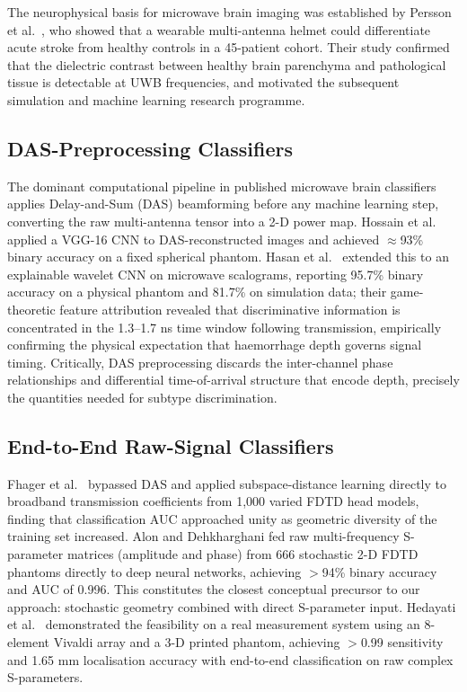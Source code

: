 \documentclass[journal]{IEEEtran}
\begin{document}
The neurophysical basis for microwave brain imaging was
established by Persson et al.\ \cite{Persson2014}, who showed
that a wearable multi-antenna helmet could differentiate acute
stroke from healthy controls in a 45-patient cohort.  Their
study confirmed that the dielectric contrast between healthy
brain parenchyma and pathological tissue is detectable at UWB
frequencies, and motivated the subsequent simulation and
machine learning research programme.

\subsection{DAS-Preprocessing Classifiers}

The dominant computational pipeline in published microwave
brain classifiers applies Delay-and-Sum (DAS) beamforming
before any machine learning step, converting the raw
multi-antenna tensor into a 2-D power map.  Hossain et al.\
\cite{Hossain2020} applied a VGG-16 CNN to DAS-reconstructed
images and achieved $\approx$93\% binary accuracy on a fixed
spherical phantom.  Hasan et al.\ \cite{Hasan2024} extended
this to an explainable wavelet CNN on microwave scalograms,
reporting 95.7\% binary accuracy on a physical phantom and
81.7\% on simulation data; their game-theoretic feature
attribution revealed that discriminative information is
concentrated in the 1.3--1.7 ns time window following
transmission, empirically confirming the physical expectation
that haemorrhage depth governs signal timing.  Critically,
DAS preprocessing discards the inter-channel phase
relationships and differential time-of-arrival structure that
encode depth, precisely the quantities needed for subtype
discrimination.

\subsection{End-to-End Raw-Signal Classifiers}

Fhager et al.\ \cite{Fhager2019} bypassed DAS and applied
subspace-distance learning directly to broadband transmission
coefficients from 1{,}000 varied FDTD head models, finding
that classification AUC approached unity as geometric
diversity of the training set increased.  Alon and
Dehkharghani \cite{Alon2021} fed raw multi-frequency
S-parameter matrices (amplitude and phase) from 666
stochastic 2-D FDTD phantoms directly to deep neural
networks, achieving $>$94\% binary accuracy and AUC of 0.996.
This constitutes the closest conceptual precursor to our
approach: stochastic geometry combined with direct
S-parameter input.  Hedayati et al.\ \cite{Hedayati2024}
demonstrated the feasibility on a real measurement system
using an 8-element Vivaldi array and a 3-D printed phantom,
achieving $>$0.99 sensitivity and 1.65 mm localisation
accuracy with end-to-end classification on raw complex
S-parameters.
\end{document}
